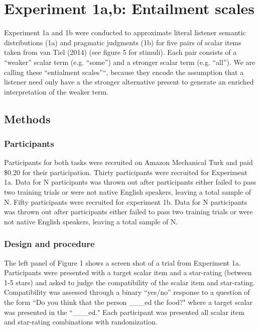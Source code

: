 \documentclass[10pt, letterpaper]{article}
\begin{document}
\section{Experiment 1a,b: Entailment
scales}\label{experiment-1ab-entailment-scales}

Experiment 1a and 1b were conducted to approximate literal listener
semantic distributions (1a) and pragmatic judgments (1b) for five pairs
of scalar items taken from van Tiel (2014) (see figure 5 for stimuli).
Each pair consists of a ``weaker'' scalar term (e.g. ``some'') and a
stronger scalar term (e.g. ``all''). We are calling these ``entialment
scales''``, because they encode the assumption that a listener need only
have a the stronger alternative present to generate an enriched
interpretation of the weaker term.

\subsection{Methods}\label{methods}

\subsubsection{Participants}\label{participants}

Participants for both tasks were recruited on Amazon Mechanical Turk and
paid \$0.20 for their participation. Thirty participants were recruited
for Experiment 1a. Data for N participants was thrown out after
participants either failed to pass two training trials or were not
native English speakers, leaving a total sample of N. Fifty participants
were recruited for experiment 1b. Data for N participants was thrown out
after participants either failed to pass two training trials or were not
native English speakers, leaving a total sample of N.

\subsubsection{Design and procedure}\label{design-and-procedure}

The left panel of Figure 1 shows a screen shot of a trial from
Experiment 1a. Participants were presented with a target scalar item and
a star-rating (between 1-5 stars) and asked to judge the compatibility
of the scalar item and star-rating. Compatibility was assessed through a
binary ``yes/no'' response to a question of the form ``Do you think that
the person \_\_\_ed the food?" where a target scalar was presented in
the ``\_\_\_ed." Each participant was presented all scalar item and
star-rating combinations with randomization.
\end{document}
